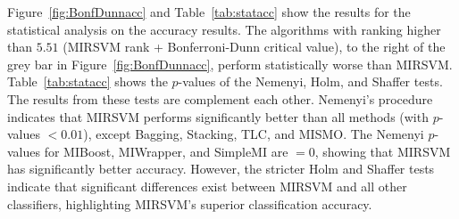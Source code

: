 Figure~\ref{fig:BonfDunnacc} and Table~\ref{tab:statacc} show the results for the statistical analysis on the accuracy results. The algorithms with ranking higher than $5.51$ (MIRSVM rank + Bonferroni-Dunn critical value), to the right of the grey bar in Figure~\ref{fig:BonfDunnacc}, perform statistically worse than MIRSVM. Table~\ref{tab:statacc} shows the $p$-values of the Nemenyi, Holm, and Shaffer tests. The results from these tests are complement each other. Nemenyi's procedure indicates that MIRSVM performs significantly better than all methods (with $p$-values $< 0.01$), except Bagging, Stacking, TLC, and MISMO. The Nemenyi $p$-values for MIBoost, MIWrapper, and SimpleMI are $= 0$, showing that MIRSVM has significantly better accuracy. However, the stricter Holm and Shaffer tests indicate that significant differences exist between MIRSVM and all other classifiers, highlighting MIRSVM's superior classification accuracy. 

